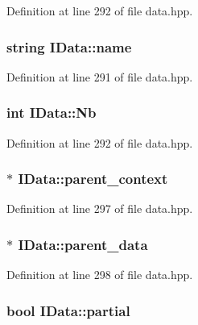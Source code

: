Definition at line 292 of file data.hpp.\hypertarget{class_i_data_a66ed7cf77dc3382dfd6fcd81dc18e8df}{
\subsubsection[{name}]{\setlength{\rightskip}{0pt plus 5cm}string {\bf IData::name}}}
\label{class_i_data_a66ed7cf77dc3382dfd6fcd81dc18e8df}


Definition at line 291 of file data.hpp.\hypertarget{class_i_data_a170ac177a6048467713780cd3605e88e}{
\subsubsection[{Nb}]{\setlength{\rightskip}{0pt plus 5cm}int {\bf IData::Nb}}}
\label{class_i_data_a170ac177a6048467713780cd3605e88e}


Definition at line 292 of file data.hpp.\hypertarget{class_i_data_a5ecc5b90d72d8b3d8a4a1af9de9fb71c}{
\subsubsection[{parent\_\-context}]{$\ast$ {\bf IData::parent\_\-context}}}
\label{class_i_data_a5ecc5b90d72d8b3d8a4a1af9de9fb71c}


Definition at line 297 of file data.hpp.\hypertarget{class_i_data_a4815f73848733b3ff225821b3d7431ea}{
\subsubsection[{parent\_\-data}]{$\ast$ {\bf IData::parent\_\-data}}}
\label{class_i_data_a4815f73848733b3ff225821b3d7431ea}


Definition at line 298 of file data.hpp.\hypertarget{class_i_data_abbfc199f238d3fe16d66bbfc18e74ad4}{
\subsubsection[{partial}]{\setlength{\rightskip}{0pt plus 5cm}bool {\bf IData::partial}}}
\label{class_i_data_abbfc199f238d3fe16d66bbfc18e74ad4}


